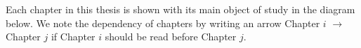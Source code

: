 \documentclass[12pt]{amsart}
\theoremstyle{plain}
\begin{document}
Each chapter in this thesis is shown with its main object of study in the diagram below.
We note the dependency of chapters by writing an arrow Chapter $i$ $\to$ Chapter $j$ if Chapter $i$ should be read before Chapter $j$.
\end{document}
